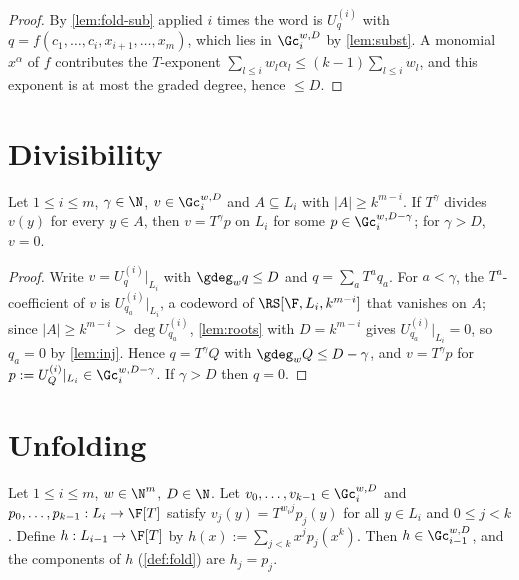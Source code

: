 \begin{proof}
By \ref{lem:fold-sub} applied $i$ times the word is $U^{(i)}_q$ with
$q=f(c_1,\dots,c_i,x_{i+1},\dots,x_m)$, which lies in $\Gc_i^{w,D}$ by \ref{lem:subst}. A monomial
$x^\alpha$ of $f$ contributes the $T$-exponent $\sum_{l\le i}w_l\alpha_l\le(k-1)\sum_{l\le i}w_l$,
and this exponent is at most the graded degree, hence $\le D$.
\end{proof}

\section{Divisibility}

\begin{lemma}[Divisibility]\label{lem:div}
Let $1\le i\le m$, $\gamma\in\N$, $v\in\Gc_i^{w,D}$ and $A\subseteq L_i$ with $|A|\ge k^{m-i}$.
If $T^\gamma$ divides $v(y)$ for every $y\in A$, then $v=T^\gamma p$ on $L_i$ for some
$p\in\Gc_i^{w,D-\gamma}$; for $\gamma>D$, $v=0$.
\end{lemma}

\begin{proof}
Write $v=U^{(i)}_q|_{L_i}$ with $\gdeg_w q\le D$ and $q=\sum_aT^aq_a$. For $a<\gamma$, the
$T^a$-coefficient of $v$ is $U^{(i)}_{q_a}|_{L_i}$, a codeword of $\RS[\F,L_i,k^{m-i}]$ that
vanishes on $A$; since $|A|\ge k^{m-i}>\deg U^{(i)}_{q_a}$, \ref{lem:roots} with $D=k^{m-i}$
gives $U^{(i)}_{q_a}|_{L_i}=0$, so $q_a=0$ by \ref{lem:inj}. Hence $q=T^\gamma Q$ with $\gdeg_w Q\le D-\gamma$, and $v=T^\gamma p$ for
$p:=U^{(i)}_Q|_{L_i}\in\Gc_i^{w,D-\gamma}$. If $\gamma>D$ then $q=0$.
\end{proof}

\section{Unfolding}

\begin{lemma}[Unfolding]\label{lem:unfold}
Let $1\le i\le m$, $w\in\N^m$, $D\in\N$. Let $v_0,\dots,v_{k-1}\in\Gc_i^{w,D}$ and
$p_0,\dots,p_{k-1}:L_i\to\F[T]$ satisfy $v_j(y)=T^{w_ij}p_j(y)$ for all $y\in L_i$ and
$0\le j<k$. Define $h:L_{i-1}\to\F[T]$ by $h(x):=\sum_{j<k}x^jp_j(x^k)$. Then
$h\in\Gc_{i-1}^{w,D}$, and the components of $h$ (\ref{def:fold}) are $h_j=p_j$.
\end{lemma}

